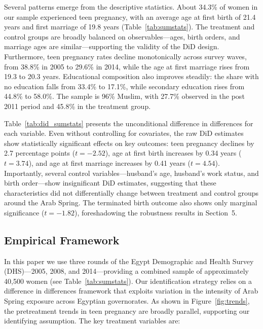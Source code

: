 \documentclass[12pt,a4paper]{article}
\begin{document}
\noindent Several patterns emerge from the descriptive statistics. About 34.3\% of women in our sample experienced teen pregnancy, with an average age at first birth of 21.4 years and first marriage of 19.8 years (Table~\ref{tab:sumstats}). The treatment and control groups are broadly balanced on observables---ages, birth orders, and marriage ages are similar---supporting the validity of the DiD design. Furthermore, teen pregnancy rates decline monotonically across survey waves, from 38.8\% in 2005 to 29.6\% in 2014, while the age at first marriage rises from 19.3 to 20.3 years. Educational composition also improves steadily: the share with no education falls from 33.4\% to 17.1\%, while secondary education rises from 44.8\% to 58.0\%. The sample is 96\% Muslim, with 27.7\% observed in the post 2011 period and 45.8\% in the treatment group.
\vspace{0.25cm}

Table~\ref{tab:did_sumstats} presents the unconditional difference in differences for each variable. Even without controlling for covariates, the raw DiD estimates show statistically significant effects on key outcomes: teen pregnancy declines by 2.7 percentage points ($t = -2.52$), age at first birth increases by 0.34 years ($t = 3.74$), and age at first marriage increases by 0.41 years ($t = 4.54$). Importantly, several control variables---husband's age, husband's work status, and birth order---show insignificant DiD estimates, suggesting that these characteristics did not differentially change between treatment and control groups around the Arab Spring. The terminated birth outcome also shows only marginal significance ($t = -1.82$), foreshadowing the robustness results in Section~5.
\vspace{0.25cm}

\subsection{Empirical Framework}

In this paper we use three rounds of the Egypt Demographic and Health Survey (DHS)---2005, 2008, and 2014---providing a combined sample of approximately 40,500 women (see Table~\ref{tab:sumstats}). Our identification strategy relies on a difference in differences framework that exploits variation in the intensity of Arab Spring exposure across Egyptian governorates. As shown in Figure~\ref{fig:trends}, the pretreatment trends in teen pregnancy are broadly parallel, supporting our identifying assumption. The key treatment variables are:
\end{document}
